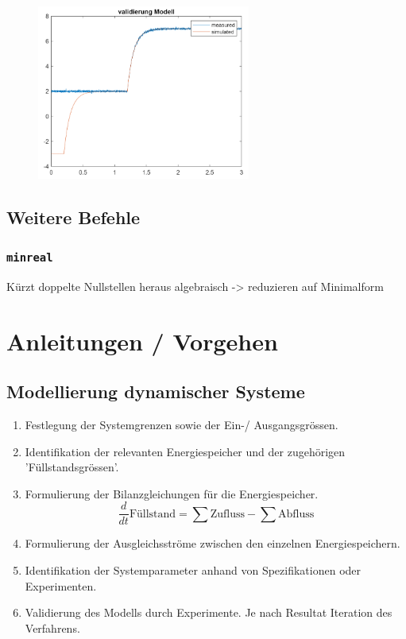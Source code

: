 \documentclass[
  10pt,
  a4paper,
  twocolumn]{article}
\providecommand{\tightlist}{%
  \setlength{\itemsep}{0pt}\setlength{\parskip}{0pt}}\usepackage{longtable,booktabs,array}
\numberwithin{equation}{section}
\begin{document}
\begin{figure}[H]

{\centering \includegraphics[width=7cm,height=\textheight]{images/paste-84.png}

}

\end{figure}

\hypertarget{weitere-befehle}{%
\subsection{Weitere Befehle}\label{weitere-befehle}}

\hypertarget{minreal}{%
\subsubsection{\texorpdfstring{\texttt{minreal}}{minreal}}\label{minreal}}

Kürzt doppelte Nullstellen heraus algebraisch -\textgreater{} reduzieren
auf Minimalform

\hypertarget{anleitungen-vorgehen}{%
\section{\texorpdfstring{\faFile*[regular] Anleitungen /
Vorgehen}{ Anleitungen / Vorgehen}}\label{anleitungen-vorgehen}}

\hypertarget{modellierung-dynamischer-systeme}{%
\subsection{Modellierung dynamischer
Systeme}\label{modellierung-dynamischer-systeme}}

\begin{enumerate}
\def\labelenumi{\arabic{enumi}.}
\tightlist
\item
  Festlegung der Systemgrenzen sowie der Ein-/ Ausgangsgrössen.
\item
  Identifikation der relevanten Energiespeicher und der zugehörigen
  'Füllstandsgrössen'.
\item
  Formulierung der Bilanzgleichungen für die Energiespeicher. \[
  \frac{d}{dt}\text{Füllstand} = \sum{\text{Zufluss}}-\sum{\text{Abfluss}}
  \]
\item
  Formulierung der Ausgleichsströme zwischen den einzelnen
  Energiespeichern.
\item
  Identifikation der Systemparameter anhand von Spezifikationen oder
  Experimenten.
\item
  Validierung des Modells durch Experimente. Je nach Resultat Iteration
  des Verfahrens.
\end{enumerate}
\end{document}
